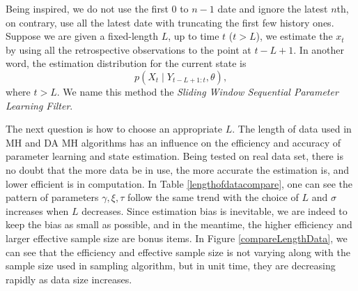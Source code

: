 Being inspired, we do not use the first $0$ to $n-1$ date and ignore the latest $n$th, on contrary, use all the latest date with truncating the first few history ones. Suppose we are given a fixed-length $L$, up to time $t$ ($t>L$),  we estimate the $x_t$ by using all the retrospective observations to the point at $t-L+1$. In another word, the estimation distribution for the current state is 
\begin{equation}
p(X_{t}\mid Y_{t-L+1:t},\theta),
\end{equation}
where $t>L$. We name this method the \textit{Sliding Window Sequential Parameter Learning Filter}. 

The next question is how to choose an appropriate $L$. The length of data used in MH and DA MH algorithms has an influence on the efficiency and accuracy of parameter learning and state estimation. Being tested on real data set, there is no doubt that the more data be in use, the more accurate the estimation is, and lower efficient is in computation. In Table \ref{lengthofdatacompare}, one can see the pattern of parameters $\gamma,\xi,\tau$ follow the same trend with the choice of $L$ and $\sigma$ increases when $L$ decreases. Since estimation bias is inevitable, we are indeed to keep the bias as small as possible, and in the meantime, the higher efficiency and larger effective sample size are bonus items. In Figure \ref{compareLengthData}, we can see that the efficiency and effective sample size is not varying along with the sample size used in sampling algorithm, but in unit time, they are decreasing rapidly as data size increases. 
